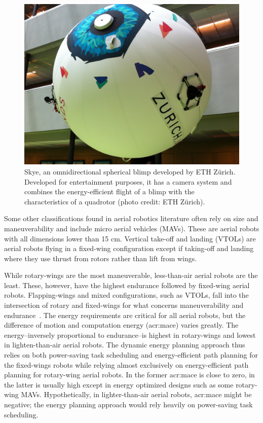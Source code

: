 \begin{figure}[h]
  \centering
  \includegraphics[width=.7\textwidth]{pictures/IMG_2612}
  \caption[Skye, an omnidirectional spherical blimp]{Skye, an omnidirectional spherical blimp developed by ETH Z\"urich. Developed for entertainment purposes, it has a camera system and combines the energy-efficient flight of a blimp with the characteristics of a quadrotor {\scriptsize(photo credit: ETH Z\"urich)}.}   
  \label{fig:skye-blimp}
\end{figure}

Some other classifications found in aerial robotics literature often rely on size and maneuverability and include micro aerial vehicles (MAVs). These are aerial robots with all dimensions lower than 15 cm. Vertical take-off and landing (VTOLs) are aerial robots flying in a fixed-wing configuration except if taking-off and landing where they use thrust from rotors rather than lift from wings. 

While rotary-wings are the most maneuverable, less-than-air aerial robots are the least. These, however, have the highest endurance followed by fixed-wing aerial robots. Flapping-wings and mixed configurations, such as VTOLs, fall into the intersection of rotary and fixed-wings for what concerns maneuverability and endurance~\citep{siciliano2016springer}. The energy requirements are critical for all aerial robots, but the difference of motion and computation energy (\Gls{acr:mace}) varies greatly. The energy--inversely proportional to endurance--is highest in rotary-wings and lowest in lighten-than-air aerial robots. The dynamic energy planning approach thus relies on both power-saving task scheduling and energy-efficient path planning for the fixed-wings robots while relying almost exclusively on energy-efficient path planning for rotary-wing aerial robots. In the former \Gls{acr:mace} is close to zero, in the latter is usually high except in energy optimized designs such as some rotary-wing MAVs. Hypothetically, in lighter-than-air aerial robots, \Gls{acr:mace} might be negative; the energy planning approach would rely heavily on power-saving task scheduling.


